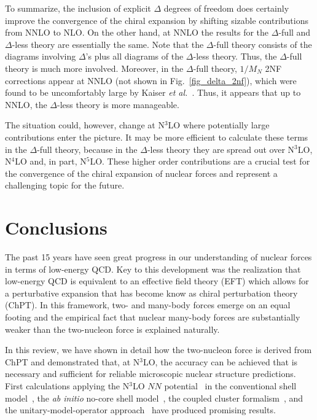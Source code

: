 \documentclass[sort&compress,preprint,3p]{elsarticle}
\begin{document}
To summarize, the inclusion of explicit $\Delta$ degrees of freedom does
certainly improve the convergence of the chiral expansion by shifting sizable
contributions from NNLO to NLO. On the other hand, at NNLO
the results for the $\Delta$-full and $\Delta$-less theory are essentially the
same. Note that the $\Delta$-full theory consists of the diagrams involving
$\Delta$'s plus all diagrams of the $\Delta$-less theory. Thus, the $\Delta$-full
theory is much more involved. Moreover, in the $\Delta$-full theory, 
$1/M_N$ 2NF corrections appear at NNLO (not shown in Fig.~\ref{fig_delta_2nf}),
which were found to be uncomfortably large by Kaiser {\it et al.}~\cite{KGW98}. 
Thus, it appears that up to NNLO, the $\Delta$-less theory is more manageable.

The situation could, however, change at N$^3$LO where potentially large contributions
enter the picture. It may be more efficient to calculate these terms in the $\Delta$-full
theory, because in the $\Delta$-less theory they are spread out
over N$^3$LO, N$^4$LO and, in part, N$^5$LO. 
These higher order contributions are a crucial test for the convergence of
the chiral expansion of nuclear forces and represent a challenging topic for the
future.


\section{Conclusions
\label{sec_concl}}

The past 15 years have seen great progress in our understanding of nuclear forces
in terms of low-energy QCD. Key to this development was the realization that
low-energy QCD is equivalent to an effective field theory (EFT) which allows for 
a perturbative expansion that has become know as chiral perturbation theory (ChPT).
In this framework, two- and many-body forces emerge on an equal footing and the empirical fact
that nuclear many-body forces are substantially weaker than the two-nucleon force
is explained naturally.

In this review, we have shown in detail how the two-nucleon force is derived
from ChPT and demonstrated that,
at N$^3$LO, the accuracy can be achieved that
is necessary and sufficient for reliable microscopic nuclear 
structure predictions.
First calculations applying the N$^3$LO
$NN$ potential~\cite{EM03}
in the conventional shell model~\cite{Cor02,Cor05,Cor10},
the {\it ab initio} no-core shell model~\cite{NC04,FNO05},
the coupled cluster formalism~\cite{Kow04,DH04,Wlo05,Dea05,Gou06,Hag08,Hag10},
and the unitary-model-operator approach~\cite{FOS04,FOS09}
have produced promising results. 
\end{document}
